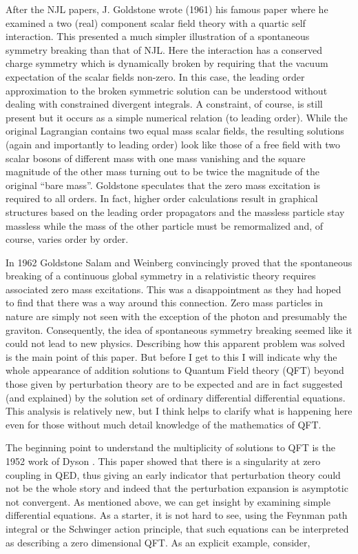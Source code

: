 \documentclass[preprintnumbers,12pt]{revtex4-2}
\begin{document}
After the NJL papers, J. Goldstone wrote (1961) \cite{jg;1961} his
famous paper where he examined a two (real) component scalar field
theory with a quartic self interaction. This presented a much simpler
illustration of a spontaneous symmetry breaking than that of NJL.
Here the interaction has a conserved charge symmetry which is
dynamically broken by requiring that the vacuum expectation of the
scalar fields non-zero. In this case, the leading
order approximation to the broken symmetric solution can be understood
without dealing with constrained divergent integrals. A constraint, of
course, is still present but it occurs as a simple numerical relation
(to leading order). While the original Lagrangian contains two equal
mass scalar fields, the resulting solutions (again and importantly to
leading order) look like those of a free field with two scalar bosons
of different mass with one mass vanishing and the square magnitude of
the other mass turning out to be twice the magnitude of the original
``bare mass''. Goldstone speculates that the zero mass excitation is required to all orders.
In fact,  higher order calculations result in graphical
structures based on the leading order propagators and the massless
particle stay massless while the mass of the other particle must be
remormalized and, of course, varies order by order.

In 1962 Goldstone Salam and Weinberg \cite{gsw;1962} convincingly proved that the
spontaneous breaking of a continuous global symmetry in a relativistic
theory requires associated zero mass excitations. This was a disappointment as they had hoped to
find that there was a way around this connection. Zero mass particles in nature are simply not seen with the
exception of the photon and presumably the graviton. Consequently, the idea of spontaneous symmetry breaking
seemed like it could not lead to new physics. Describing how this apparent problem was solved is the main point of
this paper. But before I get to this I will indicate why the whole
appearance of addition solutions to Quantum Field theory (QFT) beyond those
given by perturbation theory are to be expected and are in fact
suggested (and explained) by the solution set of ordinary differential differential equations. This
analysis is relatively new, but I think helps to clarify what is happening here even for those without
much detail knowledge of the mathematics of QFT.

The beginning point to understand the multiplicity of solutions to QFT
is the 1952 work of Dyson \cite{dyson;1952}. This paper showed that
there is a singularity at zero coupling in QED, thus giving an early
indicator that perturbation theory could not be the whole story and
indeed that the perturbation expansion is asymptotic not
convergent. As mentioned above, we can get insight by examining simple
differential equations. As a starter, it is not hard to see, using the Feynman path
integral or the Schwinger action principle, that such equations can be
interpreted as describing a zero dimensional QFT. As an explicit example, consider,
\end{document}
